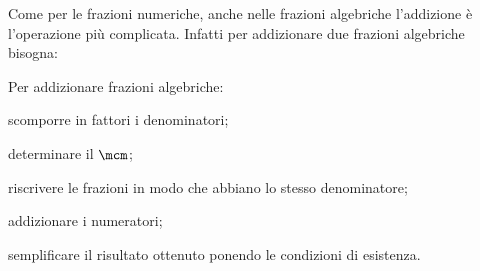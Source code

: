 Come per le frazioni numeriche, anche nelle frazioni algebriche l'addizione
è l'operazione più complicata. Infatti per addizionare due frazioni algebriche 
bisogna:

\begin{procedura}
 Per addizionare frazioni algebriche:
\begin{enumeratea}
\item scomporre in fattori i denominatori;
\item determinare il \(\mcm\);
\item riscrivere le frazioni in modo che abbiano lo stesso denominatore;
\item addizionare i numeratori;
\item semplificare il risultato ottenuto ponendo le condizioni di esistenza.
\end{enumeratea}
\end{procedura}

